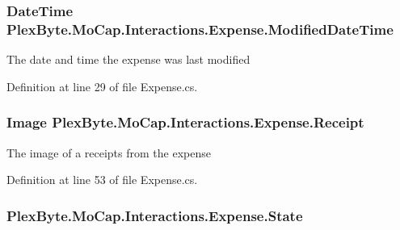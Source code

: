 \subsubsection[{\texorpdfstring{Modified\+Date\+Time}{ModifiedDateTime}}]{\setlength{\rightskip}{0pt plus 5cm}Date\+Time Plex\+Byte.\+Mo\+Cap.\+Interactions.\+Expense.\+Modified\+Date\+Time\hspace{0.3cm}{\ttfamily [get]}}\hypertarget{class_plex_byte_1_1_mo_cap_1_1_interactions_1_1_expense_a9c1bd7383b2a3a9cf02c592dce59d172}{}\label{class_plex_byte_1_1_mo_cap_1_1_interactions_1_1_expense_a9c1bd7383b2a3a9cf02c592dce59d172}


The date and time the expense was last modified 



Definition at line 29 of file Expense.\+cs.

\subsubsection[{\texorpdfstring{Receipt}{Receipt}}]{\setlength{\rightskip}{0pt plus 5cm}Image Plex\+Byte.\+Mo\+Cap.\+Interactions.\+Expense.\+Receipt\hspace{0.3cm}{\ttfamily [get]}}\hypertarget{class_plex_byte_1_1_mo_cap_1_1_interactions_1_1_expense_acb73575488e1faae9d3fd270373c345b}{}\label{class_plex_byte_1_1_mo_cap_1_1_interactions_1_1_expense_acb73575488e1faae9d3fd270373c345b}


The image of a receipts from the expense 



Definition at line 53 of file Expense.\+cs.

\subsubsection[{\texorpdfstring{State}{State}}]{ Plex\+Byte.\+Mo\+Cap.\+Interactions.\+Expense.\+State\hspace{0.3cm}{\ttfamily [get]}}\hypertarget{class_plex_byte_1_1_mo_cap_1_1_interactions_1_1_expense_a704e4d179a9908a8a53dfc578a73dedc}{}\label{class_plex_byte_1_1_mo_cap_1_1_interactions_1_1_expense_a704e4d179a9908a8a53dfc578a73dedc}


